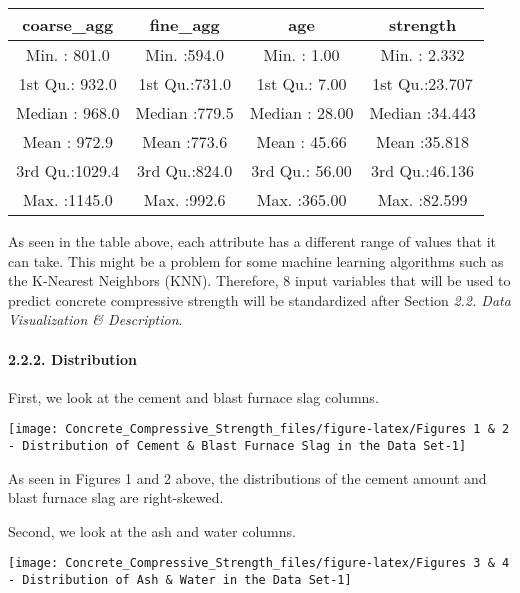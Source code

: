 \documentclass[
]{article}
\begin{document}
\begin{table}[H]
\centering\begingroup\fontsize{11}{13}\selectfont

\begin{tabular}{|>{}c|||>{}c|||>{}c|||>{}c|}
\hline
  coarse\_agg &    fine\_agg &      age &    strength\\
\hline
Min.   : 801.0 & Min.   :594.0 & Min.   :  1.00 & Min.   : 2.332\\
\hline
1st Qu.: 932.0 & 1st Qu.:731.0 & 1st Qu.:  7.00 & 1st Qu.:23.707\\
\hline
Median : 968.0 & Median :779.5 & Median : 28.00 & Median :34.443\\
\hline
Mean   : 972.9 & Mean   :773.6 & Mean   : 45.66 & Mean   :35.818\\
\hline
3rd Qu.:1029.4 & 3rd Qu.:824.0 & 3rd Qu.: 56.00 & 3rd Qu.:46.136\\
\hline
Max.   :1145.0 & Max.   :992.6 & Max.   :365.00 & Max.   :82.599\\
\hline
\end{tabular}
\endgroup{}
\end{table}

As seen in the table above, each attribute has a different range of
values that it can take. This might be a problem for some machine
learning algorithms such as the K-Nearest Neighbors (KNN). Therefore, 8
input variables that will be used to predict concrete compressive
strength will be standardized after Section \emph{2.2. Data
Visualization \& Description}.

\hypertarget{distribution}{%
\paragraph{2.2.2. Distribution}\label{distribution}}

\hfill\break
First, we look at the cement and blast furnace slag columns.

\begin{center}\texttt{[image: Concrete\_Compressive\_Strength\_files/figure-latex/Figures 1 \& 2 - Distribution of Cement \& Blast Furnace Slag in the Data Set-1]} \end{center}

As seen in Figures 1 and 2 above, the distributions of the cement amount
and blast furnace slag are right-skewed.

Second, we look at the ash and water columns.

\begin{center}\texttt{[image: Concrete\_Compressive\_Strength\_files/figure-latex/Figures 3 \& 4 - Distribution of Ash \& Water in the Data Set-1]} \end{center}
\end{document}
